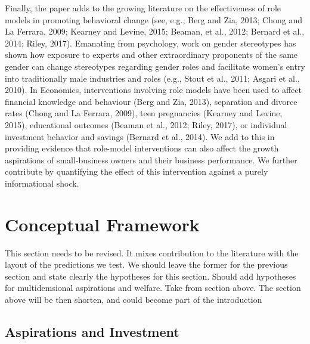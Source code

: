 \documentclass[11.5pt]{article}
\begin{document}
Finally, the paper adds to the growing literature on the effectiveness of role models in promoting behavioral change (see, e.g., Berg and Zia, 2013; Chong and La Ferrara, 2009; Kearney and Levine, 2015; Beaman, et al., 2012; Bernard et al., 2014; Riley, 2017). Emanating from psychology, work on gender stereotypes has shown how exposure to experts and other extraordinary proponents of the same gender  can change stereotypes regarding gender roles and facilitate women's entry into traditionally male industries and roles (e.g., Stout et al., 2011; Asgari et al., 2010). In Economics, interventions involving role models have been used to affect financial knowledge and behaviour (Berg and Zia, 2013), separation and divorce rates (Chong and La Ferrara, 2009), teen pregnancies (Kearney and Levine, 2015), educational outcomes (Beaman et al., 2012; Riley, 2017), or individual investment behavior and savings (Bernard et al., 2014). We add to this in providing evidence that role-model interventions can also affect the growth aspirations of small-business owners and their business performance. We further contribute by quantifying the effect of this intervention against a purely informational shock.


\section{Conceptual Framework} \label{sec:hypotheses}
\textcolor[rgb]{1.00,0.00,0.00}{This section needs to be revised. It mixes contribution to the literature with the layout of the predictions we test. We should leave the former for the previous section and state clearly the hypotheses for this section. Should add hypotheses for multidemsional aspirations and welfare. Take from section above. The section above will be then shorten, and could become part of the introduction}
\subsection{Aspirations and Investment}
\end{document}
